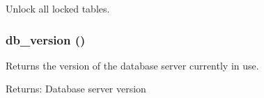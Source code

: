 Unlock all locked tables. \hypertarget{database_8mysqli_8inc_6736a6897048ff0167a0bbe5e374fc13}{
\subsubsection[{db\_\-version}]{\setlength{\rightskip}{0pt plus 5cm}db\_\-version ()}}
\label{database_8mysqli_8inc_6736a6897048ff0167a0bbe5e374fc13}


Returns the version of the database server currently in use.

\begin{Desc}
\item[Returns:]Database server version \end{Desc}

